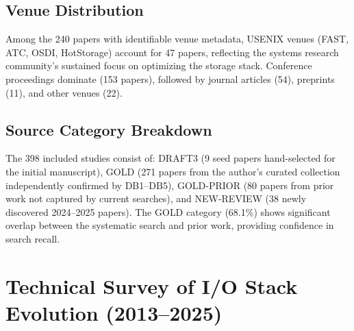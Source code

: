 \documentclass[conference]{IEEEtran}
\begin{document}
\subsection{Venue Distribution}

Among the 240 papers with identifiable venue metadata, USENIX venues (FAST, ATC, OSDI, HotStorage) account for 47 papers, reflecting the systems research community's sustained focus on optimizing the storage stack. Conference proceedings dominate (153 papers), followed by journal articles (54), preprints (11), and other venues (22).

\subsection{Source Category Breakdown}

The 398 included studies consist of: DRAFT3 (9 seed papers hand-selected for the initial manuscript), GOLD (271 papers from the author's curated collection independently confirmed by DB1--DB5), GOLD-PRIOR (80 papers from prior work not captured by current searches), and NEW-REVIEW (38 newly discovered 2024--2025 papers). The GOLD category (68.1\%) shows significant overlap between the systematic search and prior work, providing confidence in search recall.


\section{Technical Survey of I/O Stack Evolution (2013--2025)}
\label{sec:survey}
\end{document}
